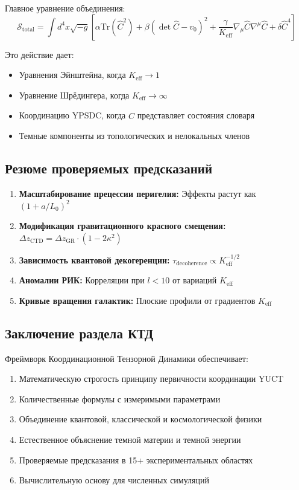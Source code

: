 \documentclass[11pt,a4paper]{article}
\begin{document}
	Главное уравнение объединения:
	\[
	\boxed{\mathcal{S}_{\mathrm{total}} = \int d^{4}x \sqrt{-g} \left[ \alpha \mathrm{Tr}(\hat{C}^2) + \beta (\det\hat{C} - v_0)^2 + \frac{\gamma}{K_{\mathrm{eff}}} \nabla_\mu\hat{C}\nabla^\mu\hat{C} + \delta \hat{C}^4 \right]}
	\]
	
	Это действие дает:
	\begin{itemize}
		\item Уравнения Эйнштейна, когда $K_{\mathrm{eff}} \to 1$
		\item Уравнение Шрёдингера, когда $K_{\mathrm{eff}} \to \infty$  
		\item Координацию YPSDC, когда $\hat{C}$ представляет состояния словаря
		\item Темные компоненты из топологических и нелокальных членов
	\end{itemize}
	
	\subsection{Резюме проверяемых предсказаний}
	
	\begin{enumerate}
		\item \textbf{Масштабирование прецессии перигелия:} Эффекты растут как $(1 + a/L_0)^2$
		\item \textbf{Модификация гравитационного красного смещения:} $\Delta z_{\mathrm{CTD}} = \Delta z_{\mathrm{GR}} \cdot (1 - 2\kappa^2)$
		\item \textbf{Зависимость квантовой декогеренции:} $\tau_{\mathrm{decoherence}} \propto K_{\mathrm{eff}}^{-1/2}$
		\item \textbf{Аномалии РИК:} Корреляции при $l < 10$ от вариаций $K_{\mathrm{eff}}$
		\item \textbf{Кривые вращения галактик:} Плоские профили от градиентов $K_{\mathrm{eff}}$
	\end{enumerate}
	
	\subsection{Заключение раздела КТД}
	
	Фреймворк Координационной Тензорной Динамики обеспечивает:
	\begin{enumerate}
		\item Математическую строгость принципу первичности координации YUCT
		\item Количественные формулы с измеримыми параметрами
		\item Объединение квантовой, классической и космологической физики
		\item Естественное объяснение темной материи и темной энергии
		\item Проверяемые предсказания в 15+ экспериментальных областях
		\item Вычислительную основу для численных симуляций
	\end{enumerate}
	
\end{document}
